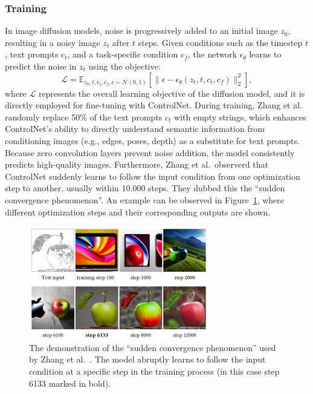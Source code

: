 \subsubsection{Training}
In image diffusion models, noise is progressively added to an initial image $z_0$, resulting in a noisy image $z_t$ after $t$ steps. Given conditions such as the timestep $t$, text prompts $c_t$, and a task-specific condition $c_f$, the network $\epsilon_\theta$ learns to predict the noise in $z_t$ using the objective:
\[
\mathcal{L} = \mathbb{E}_{z_0, t, c_t, c_f, \epsilon \sim \mathcal{N}(0, 1)} \left[ \| \epsilon - \epsilon_\theta(z_t, t, c_t, c_f) \|_2^2 \right],
\]
where $\mathcal{L}$ represents the overall learning objective of the diffusion model, and it is directly employed for fine-tuning with ControlNet. During training, Zhang et al.~\cite{zhang2023addingconditionalcontroltexttoimage} randomly replace 50\% of the text prompts $c_t$ with empty strings, which enhances ControlNet's ability to directly understand semantic information from conditioning images (e.g., edges, poses, depth) as a substitute for text prompts. Because zero convolution layers prevent noise addition, the model consistently predicts high-quality images. Furthermore, Zhang et al.\ observerd that ControlNet suddenly learns to follow the input condition from one optimization step to another, usually within 10.000 steps. They dubbed this the ``sudden convergence phenomenon''. An example can be observed in Figure~\ref{fig:control_net:training_steps}, where different optimization steps and their corresponding outputs are shown.
\begin{figure}[h!]
    \centering
    \includegraphics[width=0.7\textwidth]{assets/control_net_training_steps.pdf}
    \caption{The demonstration of the ``sudden convergence phenomenon'' used by Zhang et al.~\cite{zhang2023addingconditionalcontroltexttoimage}. The model abruptly learns to follow the input condition at a specific step in the training process (in this case step 6133 marked in bold).}
    \label{fig:control_net:training_steps}
\end{figure}

